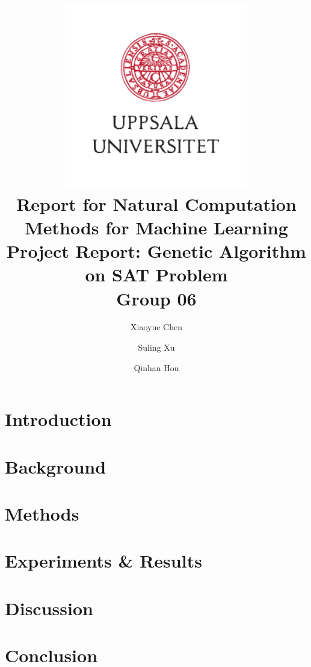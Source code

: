 \documentclass[oneside,a4paper]{article}
\title{
	\includegraphics[width=0.6\textwidth]{UU_logo.pdf}\\[1em]
	Report for Natural Computation Methods for Machine Learning\\[1em]
	Project Report: Genetic Algorithm on SAT Problem\\[3em]
	Group 06
}
\author{
	Xiaoyue Chen \and
	Suling Xu \and
	Qinhan Hou
}
\begin{document}
\maketitle
\thispagestyle{empty} %
\pagebreak


\section {Introduction}

\section {Background}

\section {Methods}

\section {Experiments \& Results}

\section {Discussion}

\section {Conclusion}
%
%
%
%
%



%


\end{document}
